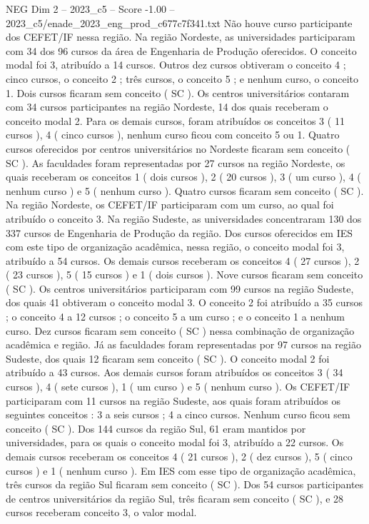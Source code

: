 \begin{textsample}{NEG Dim 2 – 2023\_c5 – Score -1.00 – 2023\_c5/enade\_2023\_eng\_prod\_c677c7f341.txt}
Não houve curso participante dos CEFET/IF nessa região.
Na região Nordeste, as universidades participaram com 34 dos 96 cursos da área de Engenharia de Produção oferecidos.
O conceito modal foi 3, atribuído a 14 cursos.
Outros dez cursos obtiveram o conceito 4 ; cinco cursos, o conceito 2 ; três cursos, o conceito 5 ; e nenhum curso, o conceito 1.
Dois cursos ficaram sem conceito ( SC ).
Os centros universitários contaram com 34 cursos participantes na região Nordeste, 14 dos quais receberam o conceito modal 2.
Para os demais cursos, foram atribuídos os conceitos 3 ( 11 cursos ), 4 ( cinco cursos ), nenhum curso ficou com conceito 5 ou 1.
Quatro cursos oferecidos por centros universitários no Nordeste ficaram sem conceito ( SC ).
As faculdades foram representadas por 27 cursos na região Nordeste, os quais receberam os conceitos 1 ( dois cursos ), 2 ( 20 cursos ), 3 ( um curso ), 4 ( nenhum curso ) e 5 ( nenhum curso ).
Quatro cursos ficaram sem conceito ( SC ).
Na região Nordeste, os CEFET/IF participaram com um curso, ao qual foi atribuído o conceito 3.
Na região Sudeste, as universidades concentraram 130 dos 337 cursos de Engenharia de Produção da região.
Dos cursos oferecidos em IES com este tipo de organização acadêmica, nessa região, o conceito modal foi 3, atribuído a 54 cursos.
Os demais cursos receberam os conceitos 4 ( 27 cursos ), 2 ( 23 cursos ), 5 ( 15 cursos ) e 1 ( dois cursos ).
Nove cursos ficaram sem conceito ( SC ).
Os centros universitários participaram com 99 cursos na região Sudeste, dos quais 41 obtiveram o conceito modal 3.
O conceito 2 foi atribuído a 35 cursos ; o conceito 4 a 12 cursos ; o conceito 5 a um curso ; e o conceito 1 a nenhum curso.
Dez cursos ficaram sem conceito ( SC ) nessa combinação de organização acadêmica e região.
Já as faculdades foram representadas por 97 cursos na região Sudeste, dos quais 12 ficaram sem conceito ( SC ).
O conceito modal 2 foi atribuído a 43 cursos.
Aos demais cursos foram atribuídos os conceitos 3 ( 34 cursos ), 4 ( sete cursos ), 1 ( um curso ) e 5 ( nenhum curso ).
Os CEFET/IF participaram com 11 cursos na região Sudeste, aos quais foram atribuídos os seguintes conceitos : 3 a seis cursos ; 4 a cinco cursos.
Nenhum curso ficou sem conceito ( SC ).
Dos 144 cursos da região Sul, 61 eram mantidos por universidades, para os quais o conceito modal foi 3, atribuído a 22 cursos.
Os demais cursos receberam os conceitos 4 ( 21 cursos ), 2 ( dez cursos ), 5 ( cinco cursos ) e 1 ( nenhum curso ).
Em IES com esse tipo de organização acadêmica, três cursos da região Sul ficaram sem conceito ( SC ).
Dos 54 cursos participantes de centros universitários da região Sul, três ficaram sem conceito ( SC ), e 28 cursos receberam conceito 3, o valor modal.

\end{textsample}
